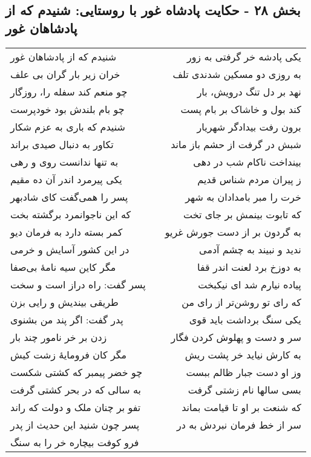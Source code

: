 \begin{center}
\section*{بخش ۲۸ - حکایت پادشاه غور با روستایی: شنیدم که از پادشاهان غور}
\label{sec:028}
\begin{longtable}{l p{0.5cm} r}
شنیدم که از پادشاهان غور
&&
یکی پادشه خر گرفتی به زور
\\
خران زیر بار گران بی علف
&&
به روزی دو مسکین شدندی تلف
\\
چو منعم کند سفله را، روزگار
&&
نهد بر دل تنگ درویش، بار
\\
چو بام بلندش بود خودپرست
&&
کند بول و خاشاک بر بام پست
\\
شنیدم که باری به عزم شکار
&&
برون رفت بیدادگر شهریار
\\
تکاور به دنبال صیدی براند
&&
شبش در گرفت از حشم باز ماند
\\
به تنها ندانست روی و رهی
&&
بینداخت ناکام شب در دهی
\\
یکی پیرمرد اندر آن ده مقیم
&&
ز پیران مردم شناس قدیم
\\
پسر را همی‌گفت کای شادبهر
&&
خرت را مبر بامدادان به شهر
\\
که این ناجوانمرد برگشته بخت
&&
که تابوت بینمش بر جای تخت
\\
کمر بسته دارد به فرمان دیو
&&
به گردون بر از دست جورش غریو
\\
در این کشور آسایش و خرمی
&&
ندید و نبیند به چشم آدمی
\\
مگر کاین سیه نامهٔ بی‌صفا
&&
به دوزخ برد لعنت اندر قفا
\\
پسر گفت: راه دراز است و سخت
&&
پیاده نیارم شد ای نیکبخت
\\
طریقی بیندیش و رایی بزن
&&
که رای تو روشن‌تر از رای من
\\
پدر گفت: اگر پند من بشنوی
&&
یکی سنگ برداشت باید قوی
\\
زدن بر خر نامور چند بار
&&
سر و دست و پهلوش کردن فگار
\\
مگر کان فرومایهٔ زشت کیش
&&
به کارش نیاید خر پشت ریش
\\
چو خضر پیمبر که کشتی شکست
&&
وز او دست جبار ظالم ببست
\\
به سالی که در بحر کشتی گرفت
&&
بسی سالها نام زشتی گرفت
\\
تفو بر چنان ملک و دولت که راند
&&
که شنعت بر او تا قیامت بماند
\\
پسر چون شنید این حدیث از پدر
&&
سر از خط فرمان نبردش به در
\\
فرو کوفت بیچاره خر را به سنگ

\end{longtable}
\end{center}
